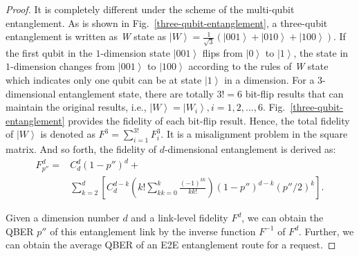 \documentclass[conference]{IEEEtran}
\begin{document}
\begin{appendices}
\begin{proof}
It is completely different under the scheme of the multi-qubit entanglement. As is shown in Fig.~\ref{three-qubit-entanglement}, a three-qubit entanglement is written as \textit{W} state as $\left| W \right\rangle  = \frac{1}{{\sqrt 3 }}(\left| {001} \right\rangle  + \left| {010} \right\rangle  + \left| {100} \right\rangle )$. If the first qubit in the $1$-dimension state $\left| {001} \right\rangle$ flips from $\left | 0 \right \rangle$ to $\left | 1 \right \rangle$, the state in $1$-dimension changes from $\left| {001} \right\rangle$ to $\left| {100} \right\rangle$ according to the rules of \textit{W} state which indicates only one qubit can be at state $\left | 1 \right \rangle$ in a dimension. For a $3$-dimensional entanglement state, there are totally $3!=6$ bit-flip results that can maintain the original results, i.e., $\left| W \right\rangle  = \left| {{W_i}} \right\rangle ,i = 1,2,...,6$. Fig.~\ref{three-qubit-entanglement} provides the fidelity of each bit-flip result. Hence, the total fidelity of $\left| W \right\rangle$ is denoted as $F^3 = \sum\limits_{i = 1}^{3!} {{F^3_i}}$. It is a misalignment problem in the square matrix. And so forth, the fidelity of $d$-dimensional entanglement is derived as:
\begin{equation}
	\begin{aligned}
		{F^d_{p''}} = & C_d^d{(1 - p'')^d} + \\
		&\sum\limits_{k = 2}^d {\left[ {C_d^{d - k}\left( {k!\sum\limits_{kk = 0}^k {\frac{{{{( - 1)}^{kk}}}}{{kk!}}} } \right){{(1 - p'')}^{d - k}}{{(p''/2)}^k}} \right]}.
	\end{aligned}
\end{equation}

Given a dimension number $d$ and a link-level fidelity $F^d$, we can obtain the QBER $p''$ of this entanglement link by the inverse function $F^{-1}$ of $F^d$. Further, we can obtain the average QBER of an E2E entanglement route for a request.
\end{proof}


\end{appendices}
\end{document}
